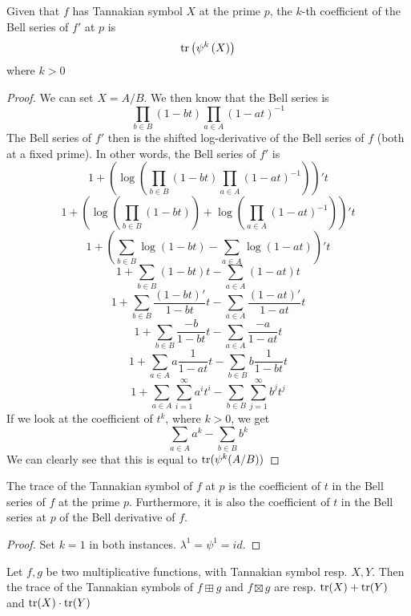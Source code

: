 \begin{theorem}
Given that $f$ has Tannakian symbol $X$ at the prime $p$, the $k$-th coefficient of the Bell series of $f'$ at $p$ is
$$\mathrm{tr}\left(\psi^k\left(X\right)\right)$$
where $k > 0$
\end{theorem}

\begin{proof}
We can set $X = A/B$. We then know that the Bell series is
$$\prod_{b \in B}\left(1 - bt\right)\prod_{a \in A}\left(1 - at\right)^{-1}$$
The Bell series of $f'$ then is the shifted log-derivative of the Bell series of $f$ (both at a fixed prime). In other words, the Bell series of $f'$ is
$$1 + \left(\log\left(\prod_{b \in B}\left(1 - bt\right)\prod_{a \in A}\left(1 - at\right)^{-1}\right)\right)'t$$
$$1 + \left(\log\left(\prod_{b \in B}\left(1 - bt\right)\right) + \log\left(\prod_{a \in A}\left(1 - at\right)^{-1}\right)\right)'t$$
$$1 + \left(\sum_{b \in B}\log\left(1 - bt\right) - \sum_{a \in A}\log\left(1 - at\right)\right)'t$$
$$1 + \sum_{b \in B}\left(1 - bt\right)t - \sum_{a \in A}\left(1 - at\right)t$$
$$1 + \sum_{b \in B}\frac{(1 - bt)'}{1 - bt}t - \sum_{a \in A}\frac{(1 - at)'}{1 - at} t$$
$$1 + \sum_{b \in B}\frac{ -b}{1 - bt}t - \sum_{a \in A}\frac{ -a }{1 - at} t$$
$$1 + \sum_{a \in A}a\frac{ 1 }{1 - at} t - \sum_{b \in B}b\frac{ 1}{1 - bt}t$$
$$1 + \sum_{a \in A}\sum_{i=1}^\infty a^it^i- \sum_{b \in B}\sum_{j=1}^\infty b^jt^j$$
If we look at the coefficient of $t^k$, where $k > 0$, we get
$$\sum_{a \in A} a^k - \sum_{b \in B} b^k$$
We can clearly see that this is equal to $\mathrm{tr}(\psi^k(A/B))$
\end{proof}

\begin{corollary}
The trace of the Tannakian symbol of $f$ at $p$ is the coefficient of $t$ in the Bell series of $f$ at the prime $p$. Furthermore, it is also the coefficient of $t$ in the Bell series at $p$ of the Bell derivative of $f$.
\end{corollary}

\begin{proof}
Set $k = 1$ in both instances. $\lambda^1 = \psi^1 = id$.
\end{proof}

\begin{proposition}
Let $f, g$ be two multiplicative functions, with Tannakian symbol resp. $X, Y$. Then the trace of the Tannakian symbols of $f \boxplus g$ and $f \boxtimes g$ are resp. $\mathrm{tr}(X) + \mathrm{tr}(Y)$ and $\mathrm{tr}(X) \cdot \mathrm{tr}(Y)$
\end{proposition}

